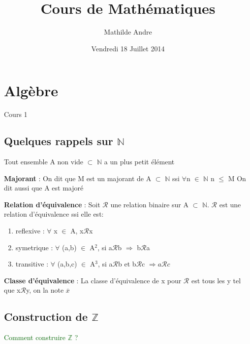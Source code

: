 \documentclass[12pt]{report}
\title{Cours de Math\'ematiques}
\author{Mathilde Andre}
\date{Vendredi 18 Juillet 2014}
\theoremstyle{break}%
\begin{document}
\maketitle
\renewcommand{\contentsname}{Sommaire}
\tableofcontents


 



\chapter{Alg\`ebre}
Cours 1
\section{Quelques rappels sur $\mathbb{N}$}
\begin{maprop}
	Tout ensemble A non vide $\subset$ $\mathbb{N}$ a un plus petit \'el\'ement
\end{maprop}
\begin{madef}
	\textbf {Majorant} : On dit que M est un majorant de A $\subset$ $\mathbb{N}$ ssi $\forall$n $\in$ $\mathbb{N}$ n $\le$ M 
	\newline
	On dit aussi que A est major\'e
\end{madef}
\begin{madef}
	\textbf {Relation d'\'equivalence} : Soit $\mathcal{R}$ une relation binaire sur A $\subset$ $\mathbb{N}$. \newline
	$\mathcal{R}$ est une relation d'\'equivalence ssi elle est:
	\begin{enumerate}
		\item reflexive :  $\forall$ x $\in$ A, x$\mathcal{R}$x 
		\item symetrique : $\forall$ (a,b) $\in$ A$^2$, si a$\mathcal{R}$b $\Rightarrow$ b$\mathcal{R}$a  
		\item transitive : $\forall$ (a,b,c) $\in$ A$^3$, si a$\mathcal{R}$b et b$\mathcal{R}$c $\Rightarrow a\mathcal{R}c$
	\end{enumerate}

	\textbf {Classe d'\'equivalence} : La classe d'\'equivalence de x pour $\mathcal{R}$ est tous les y tel que x$\mathcal{R}$y, on la note $\overline{x}$

\end{madef}




\section{Construction de $\mathbb{Z}$} 
\begin{bf}
\textcolor{darkgreen}{Comment construire $\mathbb{Z}$ ? }
\end{bf}
\end{document}
